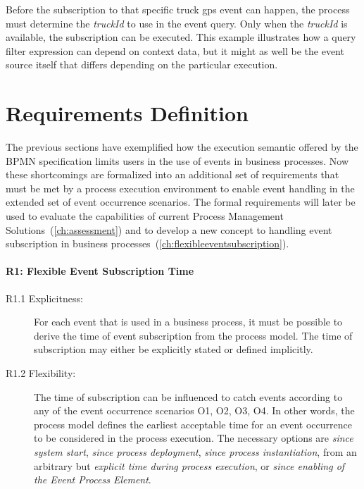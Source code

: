 
Before the subscription to that specific truck gps event can happen, the process must determine the \textit{truckId} to use in the event query. Only when the \textit{truckId} is available, the subscription can be executed. This example illustrates how a query filter expression can depend on context data, but it might as well be the event source itself that differs depending on the particular execution.




\section{Requirements Definition}
The previous sections have exemplified how the execution semantic offered by the BPMN specification limits users in the use of events in business processes. Now these shortcomings are formalized into an additional set of requirements that must be met by a process execution environment to enable event handling in the extended set of event occurrence scenarios.
The formal requirements will later be used to evaluate the capabilities of current Process Management Solutions~(\autoref{ch:assessment}) and to develop a new concept to handling event subscription in business processes~(\autoref{ch:flexibleeventsubscription}).

\paragraph{R1: Flexible Event Subscription Time}

\begin{description}
	\item[R1.1 Explicitness:] 
	For each event that is used in a business process, it must be possible to derive the time of event subscription from the process model. The time of subscription may either be explicitly stated or defined implicitly.
	\item[R1.2 Flexibility:] 
	The time of subscription can be influenced to catch events according to any of the event occurrence scenarios O1, O2, O3, O4. In other words, the process model defines the earliest acceptable time for an event occurrence to be considered in the process execution. The necessary options are \textit{since system start}, \textit{since process deployment}, \textit{since process instantiation}, from an arbitrary but \textit{explicit time during process execution}, or \textit{since enabling of the Event Process Element}.
\end{description}



